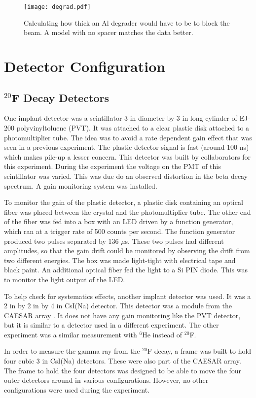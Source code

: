 \documentclass[main.tex]{subfiles}
\begin{document}
\begin{figure}[!htb]
	\centerline{\texttt{[image: degrad.pdf]}}
	\caption{Calculating how thick an Al degrader would have to be to block the beam.
	 	 A model with no spacer matches the data better.}
	\label{fig:lisealcalc}
\end{figure}
\section{Detector Configuration}

\subsection{$^{20}$F Decay Detectors}
One implant detector was a scintillator 3 in diameter by 3 in long cylinder of EJ-200 polyvinyltoluene (PVT).
It was attached to a clear plastic disk attached to a photomultiplier tube.
The idea was to avoid a rate dependent gain effect that was seen in a previous experiment.
The plastic detector signal is fast (around 100 ns) which makes pile-up a lesser concern.
This detector was built by collaborators for this experiment.
During the experiment the voltage on the PMT of this scintillator was varied.
This was due do an observed distortion in the beta decay spectrum.
A gain monitoring system was installed.

To monitor the gain of the plastic detector, a plastic disk containing an optical fiber was placed between the crystal and the photomultiplier tube. 
The other end of the fiber was fed into a box with an LED driven by a function generator, which ran at a trigger rate of 500 counts per second. 
The function generator produced two pulses separated by 136 $\mu$s.
These two pulses had different amplitudes, so that the gain drift could be monitored by observing the drift from two different energies.
The box was made light-tight with electrical tape and black paint.
An additional optical fiber fed the light to a Si PIN diode.
This was to monitor the light output of the LED.

To help check for systematics effects, another implant detector was used.
It was a 2 in by 2 in by 4 in  CsI(Na) detector. 
This detector was a module from the CAESAR array \cite{Wei10}.
It does not have any gain monitoring like the PVT detector, but it is similar to a detector used in a different experiment. 
The other experiment was a similar measurement with $^{6}$He instead of $^{20}$F.

In order to measure the gamma ray from the $^{20}$F decay, a frame was built to hold four cubic 3 in CsI(Na) detectors.  
These were also part of the CAESAR array.
The frame to hold the four detectors was designed to be able to move the four outer detectors around in various configurations.
However, no other configurations were used during the experiment. 
\end{document}
